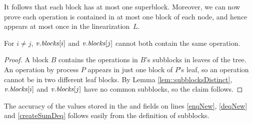 It follows that each block has at most one superblock.
Moreover, we can now prove each operation is contained in at most one block of each node,
and hence appears at most once in the linearization~$L$.

\begin{corollary}\label{cor::noDuplicates}
For  $i\neq j$, $\mbox{\textnormal{\textit{v}}}.\mbox{\textit{blocks}}[i]$ and $\mbox{\textnormal{\textit{v}}}.\mbox{\textit{blocks}}[j]$ cannot both contain the same operation.
\end{corollary}
\begin{proof}
A block $B$ contains the operations in $B$'s subblocks in leaves of the tree.
An operation by process $P$ appears in just one block of $P$'s leaf, so
an operation 
cannot be in two different leaf blocks. 
By Lemma \ref{lem::subblocksDistinct}, $\mbox{\textnormal{\textit{v}}}.\mbox{\textit{blocks}}[i]$ and $\mbox{\textnormal{\textit{v}}}.\mbox{\textit{blocks}}[j]$ have no common subblocks, so the claim follows.
\end{proof}



%


The accuracy of the values stored in the  and  fields
on lines \ref{enqNew}, \ref{deqNew} %
and \ref{createSumDeq} follows easily
from the definition of subblocks.

